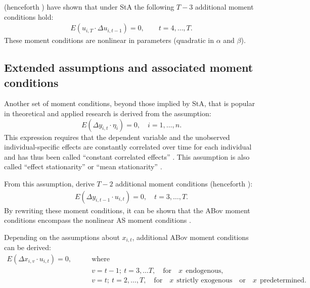 \citet{AhnSch1995} (henceforth ) have shown that under StA the following $T-3$ additional moment conditions hold:
\begin{align}\label{EQ05:AS-MC-nonlinear}
E(u_{i,T} \cdot \Delta u_{i,t-1}) = 0, \qquad t = 4,\dots,T.
\end{align}
These moment conditions are nonlinear in parameters (quadratic in $\alpha$ and $\beta$).











\subsection{Extended assumptions and associated moment conditions} \label{sec:ExtAssumpt}
Another set of moment conditions, beyond those implied by StA, that is popular in theoretical and applied research is derived from the assumption:
\begin{equation} \label{EQ07:CCE}
E(\Delta y_{i,t} \cdot \eta_i) = 0, \quad i=1,\dots,n.
\end{equation}
This expression requires that the dependent variable and the unobserved individual-specific effects are constantly correlated over time for each individual and has thus been called ``constant correlated effects'' \citep[][]{BunSar2015}. This assumption is also called ``effect stationarity'' \citep[][]{Kiv2007a} or ``mean stationarity'' \citep[][]{Are2003}.

From this assumption, \citet{AreBov1995} derive $T-2$ additional moment conditions (henceforth ):
\begin{align} \label{EQ08:AB-MC-linear_yit}
E(\Delta y_{i,t-1} \cdot u_{i,t}) = 0, \quad t=3,\dots,T.
\end{align}
By rewriting these moment conditions, it can be shown that the ABov moment conditions encompass the nonlinear AS moment conditions \citep[for a derivation see][]{Fri2019}.

Depending on the assumptions about $x_{i,t}$, additional ABov moment conditions can be derived:
\begin{align*}
E(\Delta x_{i,v} \cdot u_{i,t}) = 0, \qquad & \text{where} \\
& v = t-1;\ t=3, \dots T, \quad\text{for} \quad x \ \  \text{endogenous}, \\
& v = t;\ t=2,\dots,T, \quad \text{for} \quad x \ \ \text{strictly exogenous} \quad \text{or} \quad x \ \ \text{predetermined}.
\end{align*}


